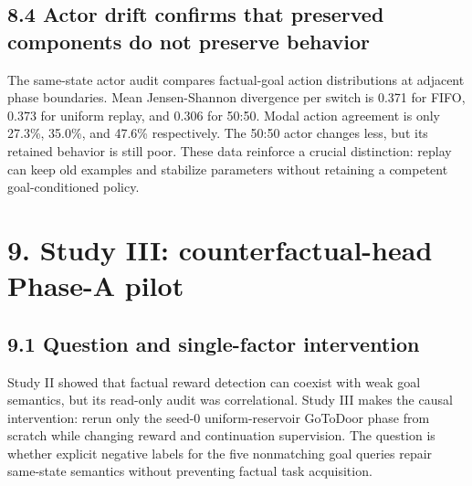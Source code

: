 \documentclass[10pt,a4paper]{article}
\newcommand{\reportsection}[1]{\section{#1}}
\newcommand{\reportsubsection}[1]{\subsection{\textcolor{brandblue}{#1}}}
\begin{document}
\reportsubsection{8.4 Actor drift confirms that preserved components do not preserve behavior}
The same-state actor audit compares factual-goal action distributions at adjacent phase boundaries. Mean Jensen-Shannon divergence per switch is 0.371 for FIFO, 0.373 for uniform replay, and 0.306 for 50:50. Modal action agreement is only 27.3\%, 35.0\%, and 47.6\% respectively. The 50:50 actor changes less, but its retained behavior is still poor. These data reinforce a crucial distinction: replay can keep old examples and stabilize parameters without retaining a competent goal-conditioned policy.

\reportsection{9. Study III: counterfactual-head Phase-A pilot}
\reportsubsection{9.1 Question and single-factor intervention}
Study II showed that factual reward detection can coexist with weak goal semantics, but its read-only audit was correlational. Study III makes the causal intervention: rerun only the seed-0 uniform-reservoir GoToDoor phase from scratch while changing reward and continuation supervision. The question is whether explicit negative labels for the five nonmatching goal queries repair same-state semantics without preventing factual task acquisition.
\end{document}
